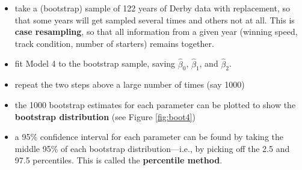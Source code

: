 \documentclass[
]{krantz}
\newenvironment{Shaded}{\begin{snugshade}}{\end{snugshade}}
\newcommand{\CommentTok}[1]{\textcolor[rgb]{0.37,0.37,0.37}{\textit{#1}}}
\newcommand{\DataTypeTok}[1]{\textcolor[rgb]{0.27,0.27,0.27}{#1}}
\newcommand{\DecValTok}[1]{\textcolor[rgb]{0.06,0.06,0.06}{#1}}
\newcommand{\FloatTok}[1]{\textcolor[rgb]{0.06,0.06,0.06}{#1}}
\newcommand{\KeywordTok}[1]{\textcolor[rgb]{0.27,0.27,0.27}{\textbf{#1}}}
\newcommand{\NormalTok}[1]{#1}
\newcommand{\OperatorTok}[1]{\textcolor[rgb]{0.43,0.43,0.43}{\textbf{#1}}}
\newcommand{\StringTok}[1]{\textcolor[rgb]{0.5,0.5,0.5}{#1}}
\providecommand{\tightlist}{%
  \setlength{\itemsep}{0pt}\setlength{\parskip}{0pt}}
\begin{document}
\begin{itemize}
\tightlist
\item
  take a (bootstrap) sample of 122 years of Derby data with replacement, so that some years will get sampled several times and others not at all. This is \textbf{case resampling}, so that all information from a given year (winning speed, track condition, number of starters) remains together.
\item
  fit Model 4 to the bootstrap sample, saving \(\hat{\beta}_0\), \(\hat{\beta}_1\), and \(\hat{\beta}_2\).
\item
  repeat the two steps above a large number of times (say 1000)
\item
  the 1000 bootstrap estimates for each parameter can be plotted to show the \textbf{bootstrap distribution} (see Figure \ref{fig:boot4})
\item
  a 95\% confidence interval for each parameter can be found by taking the middle 95\% of each bootstrap distribution---i.e., by picking off the 2.5 and 97.5 percentiles. This is called the \textbf{percentile method}.
\end{itemize}

\begin{Shaded}
\end{Shaded}
\end{document}
